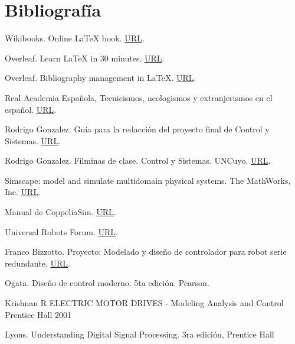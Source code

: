 \documentclass{article}
\begin{document}
\begin{sloppypar}
\section*{Bibliografía}

Wikibooks. Online \LaTeX{} book.
\href{https://en.wikibooks.org/wiki/LaTeX/}{URL}.

Overleaf. Learn LaTeX in 30 minutes.
\href{https://www.overleaf.com/learn/latex/Learn_LaTeX_in_30_minutes}{URL}.

Overleaf. Bibliography management in LaTeX.
\href{https://www.overleaf.com/learn/latex/Bibliography_management_in_LaTeX}{URL}.

Real Academia Española, Tecnicismos, neologismos y extranjerismos en el español.
\href{http://revistas.rae.es/bilrae/article/view/218/525}{URL}.

Rodrigo Gonzalez. Guía para la redacción del proyecto final de Control y Sistemas.
\href{https://es.overleaf.com/project/5ce7209e973f0d6ead24dcef}{URL}.

Rodrigo Gonzalez. Filminas de clase. Control y Sistemas. UNCuyo.
\href{https://github.com/rodralez/control}{URL}.

Simscape: model and simulate multidomain physical systems. The MathWorks, Inc.
\href{https://la.mathworks.com/products/simscape.html}{URL}.

Manual de CoppeliaSim.
\href{https://manual.coppeliarobotics.com/}{URL}.

Universal Robots Forum.
\href{https://forum.universal-robots.com/}{URL}.

Franco Bizzotto. Proyecto: Modelado y diseño de controlador para robot serie redundante.
\href{https://github.com/carloshernangarrido/control/blob/master/12_anteproyecto_proyecto-final/Bizzotto_Robot-serie.pdf}{URL}.

Ogata. Diseño de control moderno. 5ta edición. Pearson.

Krishnan R ELECTRIC MOTOR DRIVES - Modeling Analysis and Control Prentice Hall 2001

Lyons. Understanding Digital Signal Processing. 3ra edición, Prentice Hall



\printbibliography%



\end{sloppypar}
\end{document}
